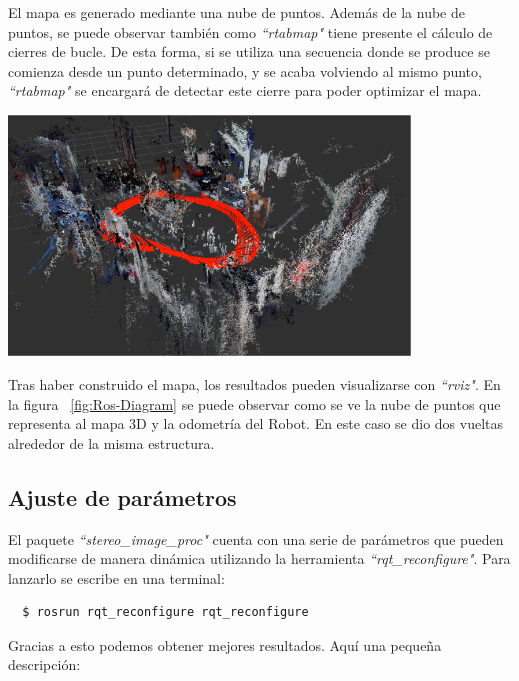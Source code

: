 El mapa es generado mediante una nube de puntos. Además de la nube de puntos, se
puede observar también como \textit{``rtabmap"} tiene presente el cálculo de
cierres de bucle. De esta forma, si se utiliza una secuencia donde se produce se
comienza desde un punto determinado, y se acaba volviendo al mismo punto,
\textit{``rtabmap"} se encargará de detectar este cierre para poder optimizar el
mapa.

\begin{minipage}{\linewidth}
    \centering
    \includegraphics[width=0.8\textwidth]{images/cap4/rviz.eps}
    \label{fig:Ros-Diagram}
\end{minipage}

Tras haber construido el mapa, los resultados pueden visualizarse con
\textit{``rviz"}. En la figura ~\ref{fig:Ros-Diagram} se puede observar como se
ve la nube de puntos que representa al mapa 3D y la odometría del Robot. En este
caso se dio dos vueltas alrededor de la misma estructura.

\subsection{Ajuste de parámetros}
El paquete \textit{``stereo\_image\_proc"} cuenta con una serie de parámetros
que pueden modificarse de manera dinámica utilizando la herramienta
\textit{``rqt\_reconfigure"}. Para lanzarlo se escribe en una terminal:
\\
\begin{lstlisting}
  $ rosrun rqt_reconfigure rqt_reconfigure
\end{lstlisting}

Gracias a esto podemos obtener mejores resultados. Aquí una pequeña descripción:

